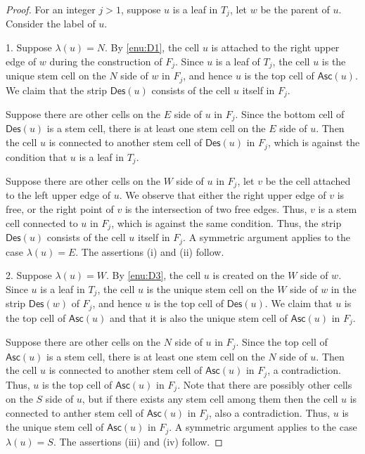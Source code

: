 \documentclass[a4paper,11pt,reqno]{amsart}
\theoremstyle{definition}
\numberwithin{equation}{section}
\newcommand{\Des}{{\textsf{Des}}}
\newcommand{\Asc}{{\textsf{Asc}}}
\begin{document}
\begin{proof} For an integer $j>1$, suppose $u$ is a leaf in $T_j$, let $w$ be the parent of $u$. Consider the label of $u$.

1.
Suppose $\lambda(u)=N$. By \ref{enu:D1}, the cell $u$ is attached to the right upper edge of $w$ during the construction of $F_j$. Since $u$ is a leaf of $T_j$, the cell $u$ is the unique stem cell on the $N$ side of $w$ in   $F_j$, and hence $u$ is the top cell of $\Asc(u)$. We claim that the strip $\Des(u)$ consists of the cell $u$ itself in $F_j$.

Suppose there are other cells on the $E$ side of $u$ in  $F_j$. Since the bottom cell of $\Des(u)$ is a stem cell, there is at least one stem cell on the $E$ side of $u$. Then the cell $u$ is connected to another stem cell of $\Des(u)$ in $F_j$, which is against the condition that $u$ is a leaf in $T_j$.

Suppose there are other cells on the $W$ side of $u$ in $F_j$, let $v$ be the cell attached to the left upper edge of $u$. We observe that either the right upper edge of $v$ is free, or the right point of $v$ is the intersection of two free edges. Thus, $v$ is a stem cell connected to $u$ in $F_j$, which is against the same condition. 
Thus, the strip $\Des(u)$ consists of the cell $u$ itself in $F_j$.  A symmetric argument applies to the case $\lambda(u)=E$. The assertions (i) and (ii) follow.


2.
Suppose $\lambda(u)=W$. By \ref{enu:D3}, the cell $u$ is created on the $W$ side of $w$. Since $u$ is a leaf in $T_j$, the cell $u$ is the unique stem cell on the $W$ side of $w$ in the strip $\Des(w)$ of $F_j$, and hence $u$ is the top cell of $\Des(u)$. We claim that $u$ is the top cell of $\Asc(u)$ and that it is also the unique stem cell of $\Asc(u)$ in $F_j$.

Suppose there are other cells on the $N$ side of $u$ in $F_j$. Since the top cell of $\Asc(u)$ is a stem cell, there is at least one stem cell on the $N$ side of $u$. Then the cell $u$ is connected to another stem cell of $\Asc(u)$ in $F_j$, a contradiction. Thus, $u$ is the top cell of $\Asc(u)$ in $F_j$. Note that there are possibly other cells on the $S$ side of $u$, but if there exists any stem cell among them then the cell $u$ is connected to anther stem cell of $\Asc(u)$ in $F_j$, also a contradiction. Thus, $u$ is the unique stem cell of $\Asc(u)$ in $F_j$. A symmetric argument applies to the case $\lambda(u)=S$. The assertions (iii) and (iv) follow.
\end{proof}
\end{document}
